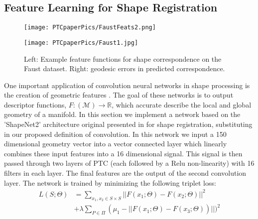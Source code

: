 \documentclass[10pt,twocolumn,letterpaper]{article}
\def\M{\mathcal{M}}
\def\RR{\mathbb{R}}
\begin{document}
\subsection{Feature Learning for Shape Registration}
\begin{figure*}[t]
\begin{minipage}{0.55\linewidth}
\centering
\texttt{[image: PTCpaperPics/FaustFeats2.png]}
\end{minipage}\hfill
\begin{minipage}{0.45\linewidth}
\texttt{[image: PTCpaperPics/Faust1.jpg]}
\end{minipage}
\caption{Left: Example feature functions for shape correspondence on the Faust dataset. Right: geodesic errors in predicted correspondence.}
\label{fig:FaustFeats}
\end{figure*}
One important application of convolution neural networks in shape processing is the creation of geometric features \cite{bronstein2017geometric}. The goal of these networks is to output descriptor functions, $F:(\M) \rightarrow  \RR$, which accurate describe the local and global geometry of a manifold. In this section we implement a network based on the 'ShapeNet2' architecture original presented in \cite{masci2015geodesic} for shape registration, substituting in our proposed definition of convolution. In this network we input a 150 dimensional geometry vector into a vector connected layer which linearly combines these input features into a 16 dimensional signal. This signal is then passed through two layers of PTC  (each followed by a Relu non-linearity) with 16 filters in each layer. The final features are the output of the second convolution layer. The network is trained by minimizing the following triplet loss:
\begin{equation}
\begin{split}
L(S;\Theta) &= 
\sum_{x_1,x_2 \in S \times S} ||F(x_1;\Theta) - F(x_2;\Theta)||^2 
\\
&+ \lambda \sum_{P \in \Pi}(\mu_1 - || F(x_1;\Theta) -  F(x_3;\Theta))||)^2 
\end{split}
\end{equation}
\end{document}
